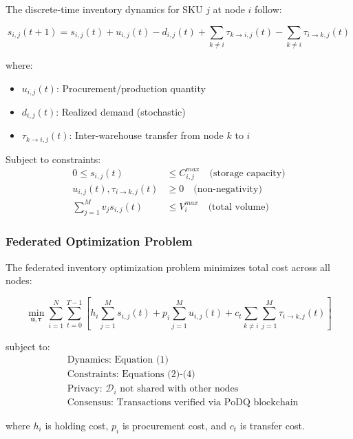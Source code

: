 \documentclass[times,10pt,twocolumn]{jucs2e}
\begin{document}
The discrete-time inventory dynamics for SKU $j$ at node $i$ follow:

\begin{equation}
s_{i,j}(t+1) = s_{i,j}(t) + u_{i,j}(t) - d_{i,j}(t) + \sum_{k \neq i} \tau_{k \to i,j}(t) - \sum_{k \neq i} \tau_{i \to k,j}(t)
\end{equation}

where:
\begin{itemize}
\item $u_{i,j}(t)$: Procurement/production quantity
\item $d_{i,j}(t)$: Realized demand (stochastic)
\item $\tau_{k \to i,j}(t)$: Inter-warehouse transfer from node $k$ to $i$
\end{itemize}

Subject to constraints:
\begin{align}
0 \leq s_{i,j}(t) &\leq C_{i,j}^{max} \quad \text{(storage capacity)} \\
u_{i,j}(t), \tau_{i \to k,j}(t) &\geq 0 \quad \text{(non-negativity)} \\
\sum_{j=1}^M v_j s_{i,j}(t) &\leq V_i^{max} \quad \text{(total volume)}
\end{align}

\subsubsection{Federated Optimization Problem}

The federated inventory optimization problem minimizes total cost across all nodes:

\begin{equation}
\min_{\mathbf{u}, \boldsymbol{\tau}} \sum_{i=1}^N \sum_{t=0}^{T-1} \left[ h_i \sum_{j=1}^M s_{i,j}(t) + p_i \sum_{j=1}^M u_{i,j}(t) + c_t \sum_{k \neq i} \sum_{j=1}^M \tau_{i \to k,j}(t) \right]
\end{equation}

subject to:
\begin{align}
&\text{Dynamics: Equation (1)} \\
&\text{Constraints: Equations (2)-(4)} \\
&\text{Privacy: } \mathcal{D}_i \text{ not shared with other nodes} \\
&\text{Consensus: Transactions verified via PoDQ blockchain}
\end{align}

where $h_i$ is holding cost, $p_i$ is procurement cost, and $c_t$ is transfer cost.
\end{document}
